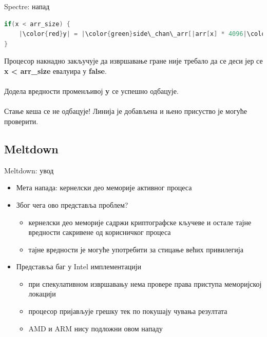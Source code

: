 \documentclass[xcolor=table]{beamer}
\begin{document}
\begin{frame}{Spectre: напад}
        \framebreak
        \begin{lstlisting}[language=java,frame=single]
if(x < arr_size) {
    |\color{red}y| = |\color{green}side\_chan\_arr[|arr[x] * 4096|\color{green}]|;
}
        \end{lstlisting}
        
        Процесор накнадно закључује да извршавање гране није требало да се деси јер се \textbf{x < arr\_size} евалуира у \textbf{false}.
        \\~\\
        Додела вредности променљивој \textbf{y} се успешно одбацује.
        \\~\\
        Стање кеша се не одбацује! Линија је добављена и њено присуство је могуће проверити.
    \end{frame}
    
    \subsection{Meltdown}
    
    \begin{frame}{Meltdown: увод}
        \begin{itemize}
            \item Мета напада: кернелски део меморије активног процеса
            \item Због чега ово представља проблем?
            \begin{itemize}
                \item кернелски део меморије садржи криптографске кључеве и остале тајне вредности сакривене од корисничког процеса
                \item тајне вредности је могуће употребити за стицање већих привилегија
            \end{itemize}
            \item Представља баг у Intel имплементацији
            \begin{itemize}
                \item при спекулативном извршавању нема провере права приступа меморијској локацији
                \item процесор пријављује грешку тек по покушају чувања резултата
                \item AMD и ARM нису подложни овом нападу
            \end{itemize}
        \end{itemize}
    \end{frame}
    
\end{document}
